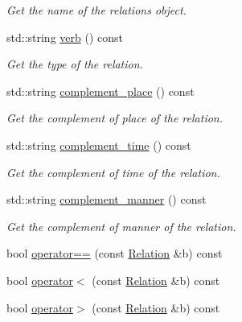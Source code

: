 \begin{DoxyCompactItemize}
\begin{DoxyCompactList}\small\item\em Get the name of the relation\textquotesingle{}s object. \end{DoxyCompactList}\item 
std\+::string \hyperlink{group__icubclient__representations_ad20612000c6327a4ee6cb1f7568ccefa}{verb} () const
\begin{DoxyCompactList}\small\item\em Get the type of the relation. \end{DoxyCompactList}\item 
std\+::string \hyperlink{group__icubclient__representations_a8a4d20108d73ff505c8cadfaeb902c98}{complement\+\_\+place} () const
\begin{DoxyCompactList}\small\item\em Get the complement of place of the relation. \end{DoxyCompactList}\item 
std\+::string \hyperlink{group__icubclient__representations_a2aa21779ce00775fc5a937e9cfc9bce0}{complement\+\_\+time} () const
\begin{DoxyCompactList}\small\item\em Get the complement of time of the relation. \end{DoxyCompactList}\item 
std\+::string \hyperlink{group__icubclient__representations_afefea8d3d76cee06eeb88dcd04e4d39e}{complement\+\_\+manner} () const
\begin{DoxyCompactList}\small\item\em Get the complement of manner of the relation. \end{DoxyCompactList}\item 
bool \hyperlink{group__icubclient__representations_a990fdaafe95a48d4a84b797f5a8e0871}{operator==} (const \hyperlink{group__icubclient__representations_classicubclient_1_1Relation}{Relation} \&b) const
\item 
bool \hyperlink{group__icubclient__representations_ac84667418f86edca13ed238e5d7472e2}{operator$<$} (const \hyperlink{group__icubclient__representations_classicubclient_1_1Relation}{Relation} \&b) const
\item 
bool \hyperlink{group__icubclient__representations_a0d96d3ec8edb6dc1898eaf7cfbb7086e}{operator$>$} (const \hyperlink{group__icubclient__representations_classicubclient_1_1Relation}{Relation} \&b) const
\end{DoxyCompactItemize}
